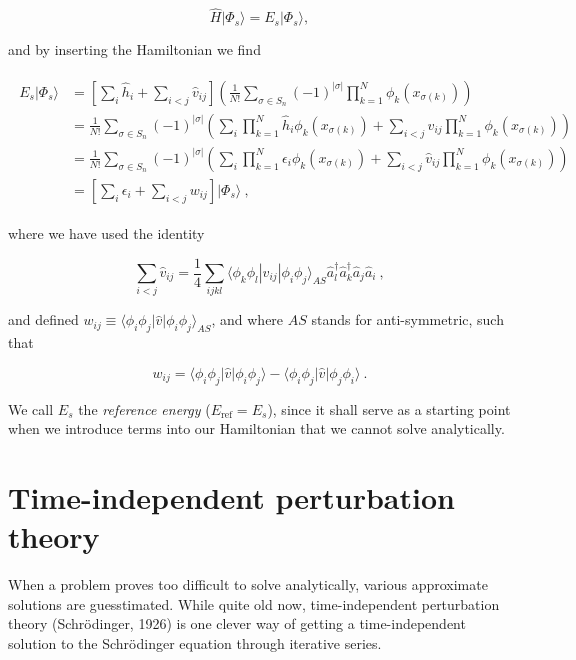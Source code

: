 \documentclass[10pt,twoside]{report}
\begin{document}
	\begin{equation}
		\hat{H}|\Phi_s\rangle = E_s|\Phi_s\rangle,
	\end{equation}
	
	\noindent and by inserting the Hamiltonian we find
	
	\begin{align}
		\begin{split}
		E_s|\Phi_s\rangle &= \left[\sum_i \hat{h}_i + \sum_{i<j} \hat{v}_{ij}\right]\left( \frac{1}{N!} \sum_{\sigma\in S_n}(-1)^{|\sigma|}\prod_{k=1}^{N}\phi_k(x_{\sigma(k)})\right) \\
		&= \frac{1}{N!} \sum_{\sigma\in S_n}(-1)^{|\sigma|}\left( \sum_i \prod_{k=1}^{N}\hat{h}_i\phi_k(x_{\sigma(k)}) + \sum_{i<j} \hat{v}_{ij}\prod_{k=1}^{N}\phi_k(x_{\sigma(k)}) \right) \\
		&= \frac{1}{N!} \sum_{\sigma\in S_n}(-1)^{|\sigma|}\left( \sum_i \prod_{k=1}^{N}\epsilon_i\phi_k(x_{\sigma(k)}) + \sum_{i<j} \hat{v}_{ij}\prod_{k=1}^{N}\phi_k(x_{\sigma(k)}) \right) \\
		&= \left[\sum_i \epsilon_i + \sum_{i<j} w_{ij}\right]|\Phi_s\rangle\:,
		\end{split}
	\end{align}
	
	\noindent where we have used the identity \cite{Kvaal15}
	
	\begin{equation}
		\sum_{i<j} \hat{v}_{ij} = \frac{1}{4}\sum_{ijkl}\langle\phi_k\phi_l|\hat{v}_{ij}|\phi_i\phi_j\rangle_{AS} \hat{a}_l^\dagger\hat{a}_k^\dagger\hat{a}_j\hat{a}_i \:,
	\end{equation}
	
	\noindent and defined $w_{ij} \equiv \langle \phi_i\phi_j|\hat{v}|\phi_i\phi_j\rangle_{AS}$, and where $AS$ stands for anti-symmetric, such that
	
	\begin{equation}
		w_{ij} = \langle \phi_i\phi_j|\hat{v}|\phi_i\phi_j\rangle - \langle \phi_i\phi_j|\hat{v}|\phi_j\phi_i\rangle\:.
	\end{equation}
	
	We call $E_s$ the \emph{reference energy} ($E_{\text{ref}} = E_s$), since it shall serve as a starting point when we introduce terms into our Hamiltonian that we cannot solve analytically.
	
	\section{Time-independent perturbation theory}
	When a problem proves too difficult to solve analytically, various approximate solutions are guesstimated. While quite old now, time-independent perturbation theory (Schr\"odinger, 1926) is one clever way of getting a time-independent solution to the Schr\"odinger equation through iterative series.\\
	
\end{document}
